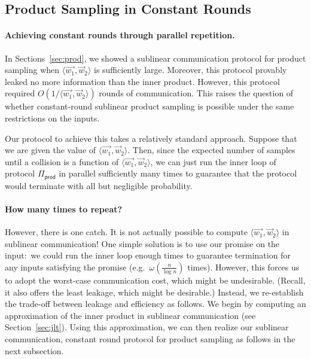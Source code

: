 \subsection{Product Sampling in Constant Rounds}\label{sec:rounds}

\paragraph{Achieving constant rounds through parallel repetition.}
In Sections~\ref{sec:prod}, we showed a sublinear communication protocol
for product sampling when $\langle \vec{{w}_1},
{\vec{w}_2} \rangle$ is sufficiently large.  Moreover, this
protocol provably leaked no more information than the inner product.
However, this protocol required $O(1/\langle \vec{{w}_1},
{\vec{w}_2} \rangle)$ rounds of communication.
This raises the question of whether constant-round sublinear product
sampling is possible under the same restrictions on the inputs.

Our protocol to achieve this takes a relatively standard approach.
Suppose that we are given the value of $\langle \vec{{w}_1},
{\vec{w}_2} \rangle$.  Then, since the expected
number of samples until a collision is a function of $\langle \vec{{w}_1},
{\vec{w}_2} \rangle$, we can just
run the inner loop of protocol $\Pi_{\mathsf{prod}}$ in parallel sufficiently many times
to guarantee that the protocol would terminate with all but negligible
probability.  

\paragraph{How many times to repeat?} However, there is one catch.  It
is not actually possible to compute $\langle \vec{{w}_1},
{\vec{w}_2} \rangle$ in sublinear communication!
One simple solution is to use our promise on the input:~we could run the
inner loop enough times to guarantee termination for any inputs
satisfying the promise (e.g.~$\omega(\frac{n}{\log n})$ times).
However, this forces us to adopt the worst-case communication cost,
which might be undesirable.  (Recall, it also offers the least leakage,
which might be desirable.) 
%
Instead, we re-establish the trade-off between leakage and efficiency as
follows.  We begin by computing an approximation of the inner product in
sublinear communication (see Section~\ref{sec:jlt}). Using this
approximation, we can then realize our sublinear communication, constant
round protocol for product sampling as follows in the next subsection.  

